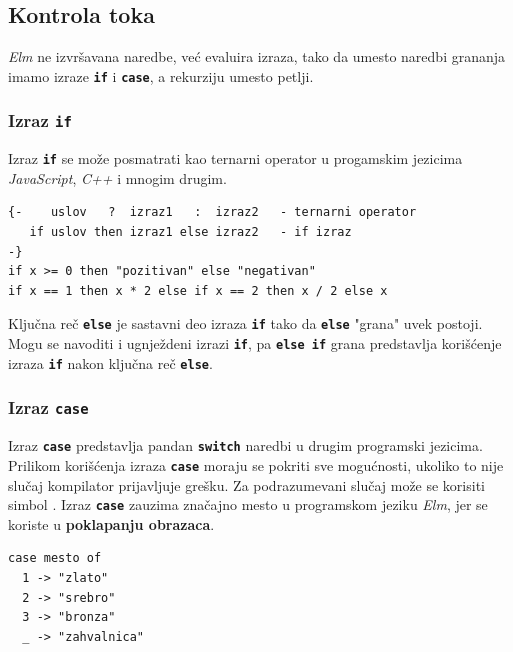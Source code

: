 \documentclass[12pt,oneside]{memoir}
\begin{document}
\subsection{Kontrola toka}
\emph{Elm} ne izvršavana naredbe, već evaluira izraza, tako da umesto naredbi grananja
imamo izraze \texttt{\textbf{if}} i \texttt{\textbf{case}}, a rekurziju umesto petlji.  
\subsubsection{Izraz \texttt{\textbf{if}}}
Izraz \texttt{\textbf{if}} se može posmatrati kao ternarni operator u progamskim jezicima \emph{JavaScript}, \emph{C++} i 
mnogim drugim.
\begin{listing}[h]
\begin{verbatim}
{-    uslov   ?  izraz1   :  izraz2   - ternarni operator
   if uslov then izraz1 else izraz2   - if izraz
-}
if x >= 0 then "pozitivan" else "negativan"
if x == 1 then x * 2 else if x == 2 then x / 2 else x
\end{verbatim}
\caption{Sintaksa izraz \texttt{\textbf{if}} i primer upotrebe}
\label{listing:if}
\end{listing}

Ključna reč \texttt{\textbf{else}} je sastavni deo izraza \texttt{\textbf{if}} tako
da \texttt{\textbf{else}} "grana" uvek postoji. Mogu se navoditi i ugnježdeni
izrazi \texttt{\textbf{if}}, pa \texttt{\textbf{else if}} grana predstavlja korišćenje
izraza \texttt{\textbf{if}} nakon ključna reč \texttt{\textbf{else}}.

\subsubsection{Izraz \texttt{\textbf{case}}}
Izraz \texttt{\textbf{case}} predstavlja pandan \texttt{\textbf{switch}} naredbi u drugim
programski jezicima. Prilikom korišćenja izraza \texttt{\textbf{case}} moraju se pokriti sve
mogućnosti, ukoliko to nije slučaj kompilator prijavljuje grešku. Za podrazumevani slučaj
može se korisiti simbol \texttt{\textbf{\textunderscore}}. Izraz \texttt{\textbf{case}}
zauzima značajno mesto u programskom jeziku \emph{Elm}, jer se koriste u \textbf{poklapanju obrazaca}.
\begin{listing}[h]
\begin{verbatim}
case mesto of
  1 -> "zlato"
  2 -> "srebro"
  3 -> "bronza"
  _ -> "zahvalnica"
\end{verbatim}
\caption{Primer upotrebe izraza \texttt{\textbf{case}}}
\label{listing:case}
\end{listing}
\end{document}
